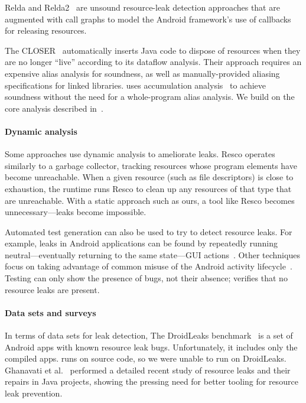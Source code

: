 Relda and Relda2~\cite{guo2013characterizing,wu2016relda2} are unsound
resource-leak detection approaches  that are
augmented with call graphs to model the Android framework's use of callbacks for
releasing resources.

The CLOSER~\cite{dillig2008closer} automatically inserts Java code to dispose of
resources when they are no longer ``live'' according to its dataflow analysis.
Their approach requires an expensive alias analysis for soundness, as well as
manually-provided aliasing specifications for linked libraries.
\Tool uses accumulation
analysis~\cite{KelloggRSSE2020,FahndrichLeino03} to achieve soundness without
the need
for a whole-program alias analysis.
We
build on the core analysis described in~\cite{KelloggRSSE2020}.

\paragraph{Dynamic analysis}
Some approaches use dynamic analysis to ameliorate leaks.  Resco \cite{dai2013resco}
operates similarly to a garbage collector, tracking resources whose program
elements have become unreachable. When a given resource (such as file
descriptors) is close to exhaustion, the runtime runs Resco to clean up any
resources of that type that are unreachable.  With a static approach such as
ours, a tool like Resco becomes unnecessary---leaks become impossible.

Automated test generation can also be used to try to detect resource
leaks. For example, leaks in Android applications can be found by
repeatedly running neutral---eventually returning to the same
state---GUI actions~\cite{wu2018sentinel,zhang2016automated}.
Other techniques focus on taking advantage of common misuse of
the Android activity lifecycle~\cite{amalfitano2020memories}.
Testing can only show the presence of bugs, not their absence;
\Tool verifies that no resource leaks are present.

\paragraph{Data sets and surveys}
In terms of data sets for leak detection, The DroidLeaks
benchmark~\cite{liu2019droidleaks} is a set of Android apps with known resource
leak bugs. Unfortunately, it includes only the compiled apps. \Tool runs on
source code, so we were unable to run \Tool on DroidLeaks. Ghanavati et
al.~\cite{ghanavati2020memory} performed a detailed recent study of resource
leaks and their repairs in Java projects, showing the pressing need for better
tooling for resource leak prevention.

